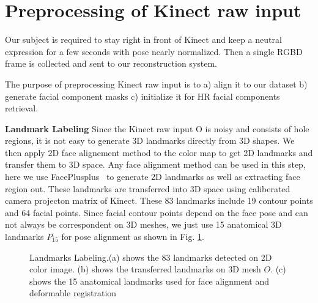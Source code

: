 \documentclass[annual]{acmsiggraph}
\begin{document}
\section{Preprocessing of Kinect raw input}
Our subject is required to stay right in front of Kinect and keep a neutral expression for a few seconds with pose nearly normalized. Then a single RGBD frame is collected and sent to our reconstruction system.

The purpose of preprocessing Kinect raw input is to a) align it to our dataset b) generate facial component masks c) initialize it for HR facial components retrieval.

\textbf{Landmark Labeling} Since the Kinect raw input O is noisy and consists of hole regions, it is not easy to generate 3D landmarks directly from 3D shapes.  We then apply 2D face alignement method to the color map to get 2D landmarks and transfer them to 3D space. Any face alignment method can be used in this step, here we use FacePlusplus~\cite{face++} to generate 2D landmarks as well as extracting face region out. These landmarks are transferred into 3D space using caliberated camera projecton matrix of Kinect. These 83 landmarks include 19 contour points and 64 facial points. Since facial contour points depend on the face pose and can not always be correspondent on 3D meshes, we just use 15 anatomical 3D landmarks  $P_{15}$ for pose alignment as shown in Fig. \ref{landmarks}.

\begin{figure}[ht]
  \centering
{}
  \caption{Landmarks Labeling.(a) shows the 83 landmarks detected on 2D color image. (b) shows the transferred landmarks on 3D mesh $O$. (c) shows the 15 anatomical landmarks used for face alignment and deformable registration}\label{landmarks}
\end{figure}
\end{document}
